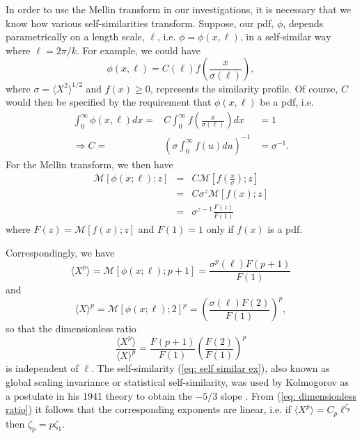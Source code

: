 In order to use the Mellin transform in our investigations, it is necessary that we know how various self-similarities transform.  Suppose, our pdf, $\phi$, depends parametrically on a length scale, $\ell$, i.e. $\phi = \phi(x,\ell)$, in a self-similar way where $\ell = 2\pi/k$.  For example, we could have
\begin{equation}
    \phi(x,\ell) = C(\ell)f\left( \frac{x}{\sigma(\ell)}\right), \label{eq: self similar ex}
\end{equation}
where $\sigma = \langle X^{2}\rangle^{1/2}$ and $f(x) \geq 0$, represents the similarity profile.  Of course, $C$ would then be specified by the requirement that $\phi(x,\ell)$ be a pdf, i.e.
\begin{eqnarray}
    \int^{\infty}_{0}\phi(x,\ell)dx = & C\int^{\infty}_{0}f\left(\frac{x}{\sigma(\ell)}\right)dx & = 1 \\
    \Rightarrow C = & \left( \sigma\int^{\infty}_{0}f(u)du\right)^{-1} & = \sigma^{-1}.
\end{eqnarray}
For the Mellin transform, we then have
\begin{eqnarray}
    \mathcal{M}[\phi(x;\ell);z] & = & C\mathcal{M}\left[f\left(\frac{x}{\sigma}\right);z \right] \nonumber \\
    & = & C\sigma^{z}\mathcal{M}[f(x);z] \nonumber \\
    & = & \sigma^{z-1}\frac{F(z)}{F(1)}
\end{eqnarray}
where $F(z) = \mathcal{M}[f(x);z]$ and $F(1) = 1$ only if $f(x)$ is a pdf.

Correspondingly, we have
\begin{equation}
    \langle X^{p} \rangle = \mathcal{M}[\phi(x;\ell); p+1] = \frac{\sigma^{p}(\ell)F(p+1)}{F(1)}
\end{equation}
and
\begin{equation}
    \langle X \rangle^{p} = \mathcal{M}[\phi(x;\ell); 2]^{p} = \left(\frac{\sigma(\ell)F(2)}{F(1)}\right)^{p},
\end{equation}
so that the dimensionless ratio
\begin{equation}
    \frac{\langle X^{p} \rangle}{\langle X \rangle^{p}} = \frac{F(p+1)}{F(1)}\left(\frac{F(2)}{F(1)}\right)^{p} \label{eq: dimensionless ratio}
\end{equation}
is independent of $\ell$.  The self-similarity (\ref{eq: self similar ex}), also known as global scaling invariance or statistical self-similarity, was used by Kolmogorov as a postulate in his 1941 theory to obtain the $-5/3$ slope \cite{Kolmogorov}. From (\ref{eq: dimensionless ratio}) it follows that the corresponding exponents are linear, i.e. if $\langle X^{p}\rangle = C_{p}\ell^{\zeta_{p}}$ then $\zeta_{p} = p\zeta_{1}$.

